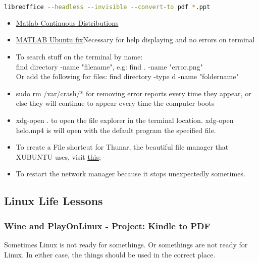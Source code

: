 \begin{lstlisting}[language=Bash, basicstyle=\footnotesize]
    libreoffice --headless --invisible --convert-to pdf *.ppt
\end{lstlisting} 
\begin{itemize}
    \item \href{ https://nl.mathworks.com/help/stats/continuous-distributions.htm}{Matlab Continuous Distributions}
    
    \item \href{https://nl.mathworks.com/support/bugreports/1765886}{MATLAB Ubuntu fix}Necessary for help displaying and no errors on terminal
    
    \item To search stuff on the terminal by name: \\ 
    find directory -name "filename", e.g: find . -name "error.png"\\
    Or add the following for files: find directory -type d -name "foldername"
    
    \item sudo rm /var/crash/* \hspace{1cm}   for removing error reports every time they appear, or else they will continue to appear every time the computer boots
    
    \item xdg-open . \hspace{1cm} to open the file explorer in the terminal location. xdg-open helo.mp4  \hspace{.5cm} is will open with the default program the specified file.
    
    \item To create a File shortcut for Thunar, the beautiful file manager that XUBUNTU uses, visit \href{https://forum.xfce.org/viewtopic.php?id=9711}{\uline{this}};
    
    \item {} \hspace{1cm} To restart the network manager because it stops unexpectedly sometimes.
    
\end{itemize}





\subsection{Linux Life Lessons}
\subsubsection{Wine and PlayOnLinux - Project: Kindle to PDF}
\par Sometimes Linux is not ready for somethings. Or somethings are not ready for Linux. In either case, the things should be used in the correct place.

